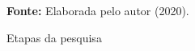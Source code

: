 \begin{figure}[ht!]
\centering

\caption{\textmd{Etapas da pesquisa}}
\label{fig:etapas}

\par\medskip\textbf{Fonte:} Elaborada pelo autor (2020). \par\medskip

\end{figure}
